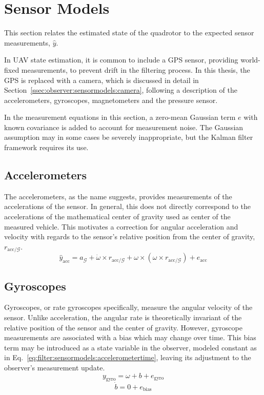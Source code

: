 \section{Sensor Models}
\label{sec:observer:sensormodels}
    This section relates the estimated state of the quadrotor to the expected sensor measurements, $\hat{y}$.

    In UAV state estimation, it is common to include a GPS sensor, providing world-fixed measurements,
    to prevent drift in the filtering process. In this thesis, the GPS is replaced with a camera,
    which is discussed in detail in Section~\ref{ssec:observer:sensormodels:camera}, following
    a description of the accelerometers, gyroscopes, magnetometers and the pressure sensor.

    In the measurement equations in this section, a zero-mean Gaussian term $e$ with known covariance is added
    to account for measurement noise. The Gaussian assumption may in some
    cases be severely inappropriate, but the Kalman filter framework requires its use.

    \subsection{Accelerometers}
        The accelerometers, as the name suggests, provides measurements of the
        accelerations of the sensor. In general, this does not directly correspond
        to the accelerations of the mathematical center of gravity used
        as center of the measured vehicle. This motivates a correction
        for angular acceleration and velocity with regards to the sensor's
        relative position from the center of gravity, $r_{\text{acc}/\mathcal{G}}$.
        \begin{equation}
            \hat{y}_{\text{acc}} = a_{\mathcal{G}} + \dot{\omega} \times r_{\text{acc}/\mathcal{G}} + \omega \times \left( \omega \times r_{\text{acc}/\mathcal{G}} \right) + e_{\text{acc}}
        \end{equation}

    \subsection{Gyroscopes}
        Gyroscopes, or rate gyroscopes specifically, measure the angular velocity
        of the sensor. Unlike acceleration, the angular rate is theoretically
        invariant of the relative position of the sensor and the center of gravity.
        However, gyroscope measurements are associated with a bias which may
        change over time. This bias term may be introduced as a state variable in the observer,
        modeled constant as in Eq.~\eqref{eq:filter:sensormodels:accelerometertime},
        leaving its adjustment to the observer's measurement update.
        \begin{equation}
            y_{\text{gyro}} = \omega + b + e_{\text{gyro}}
        \end{equation}
        \begin{equation}
            \label{eq:filter:sensormodels:accelerometertime}
            \dot{b} = 0 + e_{\text{bias}}
        \end{equation}

